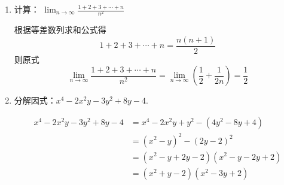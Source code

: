 \documentclass[answers]{exam}
\begin{document}
\begin{questions}
\begin{enumerate}[label=(\arabic*)]
\begin{solution}
		      \end{solution}
		\item 计算： \( \displaystyle \lim_{n\to\infty}\frac{1+2+3+\cdots+n}{n^2} \)
		      \begin{solution}
			      根据等差数列求和公式得
			      \begin{equation*}
				      1 + 2 + 3 + \cdots + n = \frac{n(n+1)}{2}
			      \end{equation*}
			      则原式
			      \begin{equation*}
				      \lim_{n\to\infty}\frac{1+2+3+\cdots+n}{n^2} = \lim_{n\to\infty}(\frac12 + \frac{1}{2n}) = \frac12
			      \end{equation*}
		      \end{solution}
		\item 分解因式：$ x^4 - 2x^2y - 3y^2 + 8y - 4 $.
		      \begin{solution}
			      \begin{align*}
				      x^4 - 2x^2y - 3y^2 + 8y - 4 & = x^4 - 2x^2y + y^2 - (4y^2 - 8y + 4)  \\
				                                  & = (x^2 - y)^2 - (2y - 2)^2             \\
				                                  & = (x^2 - y + 2y - 2)(x^2 - y - 2y + 2) \\
				                                  & = (x^2 + y - 2)(x^2 - 3y + 2)
			      \end{align*}
		      \end{solution}
	\end{enumerate}
\end{questions}
\end{document}
